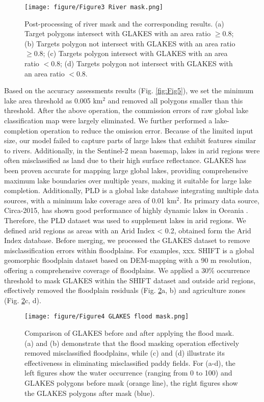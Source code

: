 \documentclass[preprint,12pt,authoryear]{elsarticle}
\begin{document}
\begin{figure}[h]
    \centering
    \texttt{[image: figure/Figure3 River mask.png]}
    \caption{Post-processing of river mask and the corresponding results. (a) Target polygons intersect with GLAKES with an area ratio $\geq$0.8; (b) Targets polygon not intersect with GLAKES with an area ratio $\geq$0.8; (c) Targets polygon intersect with GLAKES with an area ratio $<$0.8; (d) Targets polygon not intersect with GLAKES with an area ratio $<$0.8.}
    \label{fig:Fig3}
\end{figure}

Based on the accuracy assessments results (Fig. \ref{fig:Fig5}), we set the minimum lake area threshold as 0.005 km$^2$ and removed all polygons smaller than this threshold. After the above operation, the commission errors of raw global lake classification map were largely eliminated. We further performed a lake-completion operation to reduce the omission error. Because of the limited input size, our model failed to capture parts of large lakes that exhibit features similar to rivers. Additionally, in the Sentinel-2 mean basemap, lakes in arid regions were often misclassified as land due to their high surface reflectance. GLAKES has been proven accurate for mapping large global lakes, providing comprehensive maximum lake boundaries over multiple years, making it suitable for large lake completion. Additionally, PLD \citep{wang_global_2022} is a global lake database integrating multiple data sources, with a minimum lake coverage area of 0.01 km$^2$. Its primary data source, Circa-2015, has shown good performance of highly dynamic lakes in Oceania \citep{sheng_representative_2016}. Therefore, the PLD dataset was used to supplement lakes in arid regions. We defined arid regions as areas with an Arid Index < 0.2, obtained form the Arid Index database\citep{zomer_version_2022}.
 Before merging, we processed the GLAKES dataset to remove misclassification errors within floodplains. For examples, xxx.  SHIFT \citep{zheng_shift_2024} is a global geomorphic floodplain dataset based on DEM-mapping with a 90 m resolution, offering a comprehensive coverage of floodplains. We applied a 30\% occurrence threshold to mask GLAKES within the SHIFT dataset and outside arid regions, effectively removed the floodplain residuals (Fig. \ref{fig:Fig4}a, b) and agriculture zones (Fig. \ref{fig:Fig4}c, d). 

\begin{figure}[h]
    \centering
    \texttt{[image: figure/Figure4 GLAKES flood mask.png]}
    \caption{Comparison of GLAKES before and after applying the flood mask. (a) and (b) demonstrate that the flood masking operation effectively removed misclassified floodplains, while (c) and (d) illustrate its effectiveness in eliminating misclassified paddy fields. For (a-d), the left figures show the water occurrence (ranging from 0 to 100) and GLAKES polygons before mask (orange line), the right figures show the GLAKES polygons after mask (blue).}
    \label{fig:Fig4}
\end{figure}
\end{document}
